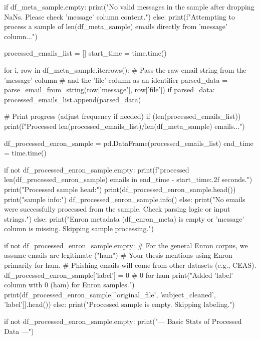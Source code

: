 \begin{ffcode}
        if df_meta_sample.empty:
            print("No valid messages in the sample after dropping NaNs. Please check 'message' column content.")
        else:
            print(f"Attempting to process a sample of {len(df_meta_sample)} emails directly from 'message' column...")
    
            processed_emails_list = []
            start_time = time.time()
    
            for i, row in df_meta_sample.iterrows():
                # Pass the raw email string from the 'message' column
                # and the 'file' column as an identifier
                parsed_data = parse_email_from_string(row['message'], row['file'])
                if parsed_data:
                    processed_emails_list.append(parsed_data)
    
                # Print progress (adjust frequency if needed)
                if (len(processed_emails_list)) %
                     print(f"Processed {len(processed_emails_list)}/{len(df_meta_sample)} emails...")
    
            df_processed_enron_sample = pd.DataFrame(processed_emails_list)
            end_time = time.time()
    
            if not df_processed_enron_sample.empty:
                print(f"\nSuccessfully processed {len(df_processed_enron_sample)} emails in {end_time - start_time:.2f} seconds.")
                print("Processed sample head:")
                print(df_processed_enron_sample.head())
                print("\nProcessed sample info:")
                df_processed_enron_sample.info()
            else:
                print("No emails were successfully processed from the sample. Check parsing logic or input strings.")
    else:
        print("Enron metadata (df_enron_meta) is empty or 'message' column is missing. Skipping sample processing.")
     
if not df_processed_enron_sample.empty:
    # For the general Enron corpus, we assume emails are legitimate ("ham")
    # Your thesis mentions using Enron primarily for ham.
    # Phishing emails will come from other datasets (e.g., CEAS).
    df_processed_enron_sample['label'] = 0  # 0 for ham
    print("Added 'label' column with 0 (ham) for Enron samples.")
    print(df_processed_enron_sample[['original_file', 'subject_cleaned', 'label']].head())
else:
    print("Processed sample is empty. Skipping labeling.")

    if not df_processed_enron_sample.empty:
    print("--- Basic Stats of Processed Data ---")


\end{ffcode}
